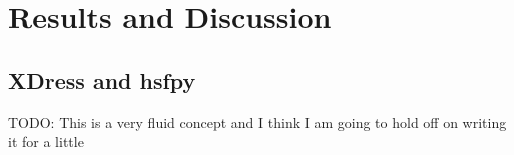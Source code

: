 
\section{Results and Discussion} \label{sec:results_and_discussion}

\subsection{XDress and hsfpy} \label{sub:xdress_and_hsfpy}

TODO: This is a very fluid concept and I think I am going to hold off on writing it for a little

